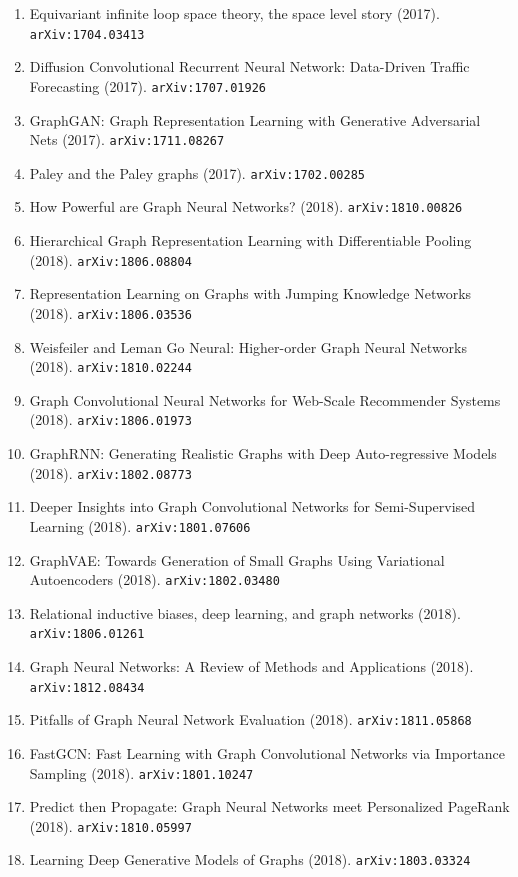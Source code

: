 \documentclass[11pt]{article}
\begin{document}
\begin{enumerate}
  Spectral Filters (2017). \texttt{arXiv:1705.07664}
  \item Equivariant infinite loop space theory, the space level story (2017). \texttt{arXiv:1704.03413}
  \item Diffusion Convolutional Recurrent Neural Network: Data-Driven Traffic
  Forecasting (2017). \texttt{arXiv:1707.01926}
  \item GraphGAN: Graph Representation Learning with Generative Adversarial Nets (2017). \texttt{arXiv:1711.08267}
  \item Paley and the Paley graphs (2017). \texttt{arXiv:1702.00285}
  \item How Powerful are Graph Neural Networks? (2018). \texttt{arXiv:1810.00826}
  \item Hierarchical Graph Representation Learning with Differentiable Pooling (2018). \texttt{arXiv:1806.08804}
  \item Representation Learning on Graphs with Jumping Knowledge Networks (2018). \texttt{arXiv:1806.03536}
  \item Weisfeiler and Leman Go Neural: Higher-order Graph Neural Networks (2018). \texttt{arXiv:1810.02244}
  \item Graph Convolutional Neural Networks for Web-Scale Recommender Systems (2018). \texttt{arXiv:1806.01973}
  \item GraphRNN: Generating Realistic Graphs with Deep Auto-regressive Models (2018). \texttt{arXiv:1802.08773}
  \item Deeper Insights into Graph Convolutional Networks for Semi-Supervised
  Learning (2018). \texttt{arXiv:1801.07606}
  \item GraphVAE: Towards Generation of Small Graphs Using Variational
  Autoencoders (2018). \texttt{arXiv:1802.03480}
  \item Relational inductive biases, deep learning, and graph networks (2018). \texttt{arXiv:1806.01261}
  \item Graph Neural Networks: A Review of Methods and Applications (2018). \texttt{arXiv:1812.08434}
  \item Pitfalls of Graph Neural Network Evaluation (2018). \texttt{arXiv:1811.05868}
  \item FastGCN: Fast Learning with Graph Convolutional Networks via Importance
  Sampling (2018). \texttt{arXiv:1801.10247}
  \item Predict then Propagate: Graph Neural Networks meet Personalized PageRank (2018). \texttt{arXiv:1810.05997}
  \item Learning Deep Generative Models of Graphs (2018). \texttt{arXiv:1803.03324}

\end{enumerate}
\end{document}
